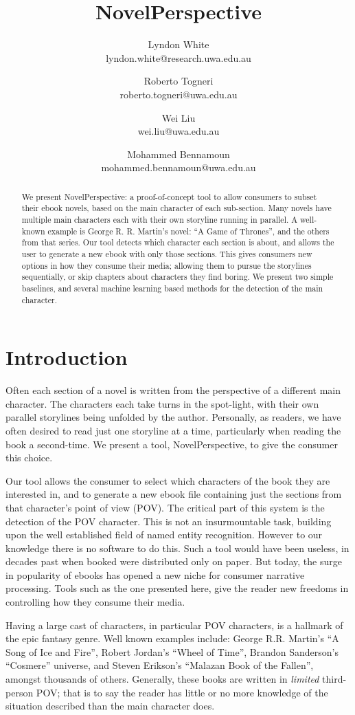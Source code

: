 \documentclass[11pt,a4paper]{article}
\title{NovelPerspective}
\author{Lyndon White \\ lyndon.white@research.uwa.edu.au %
	\and Roberto Togneri \\ roberto.togneri@uwa.edu.au%
	\and Wei Liu \\ wei.liu@uwa.edu.au %
	\and Mohammed Bennamoun \\ mohammed.bennamoun@uwa.edu.au %
}
\begin{document}
\maketitle

\begin{abstract}
We present NovelPerspective: a proof-of-concept tool to allow consumers to subset their ebook novels, based on the main character of each sub-section.
Many novels have multiple main characters each with their own storyline running in parallel.
A well-known example is George R. R. Martin's  novel: ``A Game of Thrones'', and the others from that series.
Our tool detects which character each section is about,
and allows the user to generate a new ebook with only those sections.
This gives consumers new options in how they consume their media; allowing them to  pursue the storylines sequentially, or skip chapters about characters they find boring.
We present two simple baselines, and several machine learning based methods for the detection of the main character.
\end{abstract}

\section{Introduction}
Often each section of a novel is written  from the perspective of a different main character.
The characters each take turns in the spot-light,
with their own parallel storylines being unfolded by the author.
Personally, as readers, we have often desired to read just one storyline at a time, particularly when reading the book a second-time.
We present a tool, NovelPerspective, to give the consumer this choice.

Our tool allows the consumer to select which characters of the book they are interested in,
and to generate a new ebook file containing just the sections from that character's point of view (POV).
The critical part of this system is the detection of the POV character.
This is not an insurmountable task, building upon the well established field of named entity recognition.
However to our knowledge there is no software to do this.
Such a tool would have been useless, in decades past when booked were distributed only on paper.
But today, the surge in popularity of ebooks has opened a new niche for consumer narrative processing.
Tools such as the one presented here, give the reader new freedoms in controlling how they consume their media.

Having a large cast of characters, in particular POV characters, is a hallmark of the epic fantasy genre.
Well known examples include: George R.R. Martin's ``A Song of Ice and Fire'', 
Robert Jordan's ``Wheel of Time'', Brandon Sanderson's ``Cosmere'' universe, and
Steven Erikson's ``Malazan Book of the Fallen'', amongst thousands of others.
Generally, these books are written in \emph{limited} third-person POV;
that is to say the reader has little or no more knowledge of the situation described than the main character does.
\end{document}
